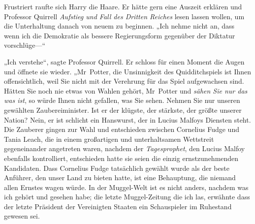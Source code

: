 Frustriert raufte sich Harry die Haare. Er hätte gern eine Auszeit erklären und Professor Quirrell \emph{Aufstieg und Fall des Dritten Reiches} lesen lassen wollen, um die Unterhaltung danach von neuem zu beginnen.
„Ich nehme nicht an, dass wenn ich die Demokratie als bessere Regierungsform gegenüber der Diktatur vorschlüge—“

„Ich verstehe“, sagte Professor Quirrell. Er schloss für einen Moment die Augen und öffnete sie wieder.
„Mr~Potter, die Unsinnigkeit des Quidditchspiels ist Ihnen offensichtlich, weil Sie nicht mit der Verehrung für das Spiel aufgewachsen sind. Hätten Sie noch nie etwas von Wahlen gehört, Mr~Potter und \emph{sähen Sie nur das was ist}, so würde Ihnen nicht gefallen, was Sie sehen. Nehmen Sie nur unseren gewählten Zaubereiminister. Ist er der klügste, der stärkste, der größte unserer Nation? Nein, er ist schlicht ein Hanswurst, der in Lucius Malfoys Diensten steht. Die Zauberer gingen zur Wahl und entschieden zwischen Cornelius Fudge und Tania Leach, die in einem großartigen und unterhaltsamen Wettstreit gegeneinander angetreten waren, nachdem der \emph{Tagesprophet}, den Lucius Malfoy ebenfalls kontrolliert, entschieden hatte sie seien die einzig ernstzunehmenden Kandidaten. Dass Cornelius Fudge tatsächlich gewählt wurde als der beste Anführer, den unser Land zu bieten hatte, ist eine Behauptung, die niemand allen Ernstes wagen würde. In der Muggel-Welt ist es nicht anders, nachdem was ich gehört und gesehen habe; die letzte Muggel-Zeitung die ich las, erwähnte dass der letzte Präsident der Vereinigten Staaten ein Schauspieler im Ruhestand gewesen sei.%
